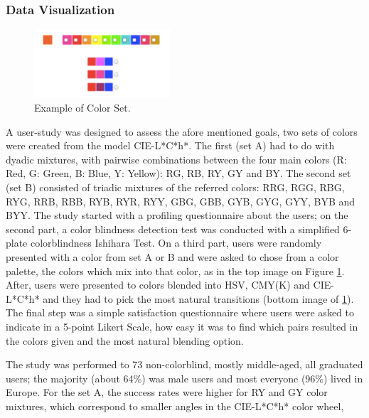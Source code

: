 \subsubsection{Data Visualization}
\label{subsubsec:datavisualization}
%
\begin{figure}
	\centering
    \vspace{-\baselineskip}
    \includegraphics[width=0.45\textwidth]{images/background/TestDataVis.png}
    \caption[Color Blending for Data Visualization]{Example of Color Set. \protect\cite{Gama20141}}
    \label{fig:datavis}
\end{figure}
%
A user-study was designed \cite{Gama20141} to assess the afore mentioned goals, two sets of colors were created
from the model CIE-L*C*h*. The first (set A) had to do with dyadic mixtures, with pairwise combinations between
the four main colors (R: Red, G: Green, B: Blue, Y: Yellow): RG, RB, RY, GY and BY. The second set (set B) consisted
of triadic mixtures of the referred colors:
RRG, RGG, RBG, RYG, RRB, RBB, RYB, RYR, RYY, GBG, GBB, GYB, GYG, GYY, BYB and BYY. The study started with a
profiling questionnaire about the users; on the second part, a color blindness detection test was conducted
with a simplified 6-plate colorblindness Ishihara Test. On a third part, users were randomly
presented with a color from set A or B and were asked to chose from a color palette, the colors which mix
into that color, as in the top image on Figure \ref{fig:datavis}. After, users were presented to colors blended
into HSV, CMY(K) and CIE-L*C*h* and they had to pick the most natural transitions (bottom image of \ref{fig:datavis}).
The final step was a simple satisfaction questionnaire where users were asked to indicate in a 5-point Likert Scale,
how easy it was to find which pairs resulted in the colors given and the most natural blending option. \par
%
The study was performed to 73 non-colorblind, mostly middle-aged, all graduated users; the majority
(about 64\%) was male users and most everyone (96\%) lived in Europe. For the set A, the success rates
were higher for RY and GY color mixtures, which correspond to smaller angles in the CIE-L*C*h* color wheel,
